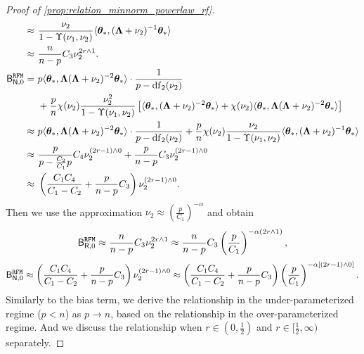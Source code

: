 \begin{proof}[Proof of \cref{prop:relation_minnorm_powerlaw_rf}]
\[\begin{aligned}
\approx&~ \frac{\nu_2}{1 - \Upsilon(\nu_1, \nu_2)} \langle {\boldsymbol \theta}_*, ({\boldsymbol \Lambda} + \nu_2)^{-1} {\boldsymbol \theta}_* \rangle\\
\approx&~ \frac{n}{n-p} C_3 \nu_2^{2r\wedge1}.\\
\mathsf B_{\mathsf N,0}^{\tt RFM} =&~ p \langle {\boldsymbol \theta}_*, {\boldsymbol \Lambda} ( {\boldsymbol \Lambda} + \nu_2)^{-2} {\boldsymbol \theta}_* \rangle \cdot \frac{1}{p - {\rm df}_2(\nu_2)}\\
&~+ \frac{p}{n} \chi(\nu_2) \frac{\nu_2^2}{1 - \Upsilon(\nu_1, \nu_2)} \left[ \langle {\boldsymbol \theta}_*, ({\boldsymbol \Lambda} + \nu_2)^{-2} {\boldsymbol \theta}_* \rangle + \chi(\nu_2) \langle {\boldsymbol \theta}_*, {\boldsymbol \Lambda} ({\boldsymbol \Lambda} + \nu_2)^{-2} {\boldsymbol \theta}_* \rangle \right] \\
\approx&~ p \langle {\boldsymbol \theta}_*, {\boldsymbol \Lambda} ( {\boldsymbol \Lambda} + \nu_2)^{-2} {\boldsymbol \theta}_* \rangle \cdot \frac{1}{p - {\rm df}_2(\nu_2)} + \frac{p}{n} \chi(\nu_2) \frac{\nu_2}{1 - \Upsilon(\nu_1, \nu_2)} \langle {\boldsymbol \theta}_*, ({\boldsymbol \Lambda} + \nu_2)^{-1} {\boldsymbol \theta}_* \rangle\\
\approx&~ \frac{p}{p-\frac{C_2}{C_1}p} C_4 \nu_2^{(2r-1)\wedge0} + \frac{p}{n-p} C_3 \nu_2^{(2r-1)\wedge0}\\
\approx&~ \left(\frac{C_1C_4}{C_1-C_2} + \frac{p}{n-p}C_3\right) \nu_2^{(2r-1)\wedge0}.
\end{aligned}
\]
Then we use the approximation $\nu_2 \approx (\frac{p}{C_1})^{-\alpha}$ and obtain
\[
\begin{aligned}
\mathsf B_{\mathsf R,0}^{\tt RFM} 
\approx \frac{n}{n-p} C_3 \nu_2^{2r\wedge1} \approx \frac{n}{n-p} C_3 \left( \frac{p}{C_1} \right)^{-\alpha\left(2r\wedge1\right)},
\end{aligned}
\]
\[
\begin{aligned}
\mathsf B_{\mathsf N,0}^{\tt RFM} \approx \left(\frac{C_1C_4}{C_1-C_2}+\frac{p}{n-p}C_3\right) \nu_2^{(2r-1)\wedge0} \approx \left(\frac{C_1C_4}{C_1-C_2}+\frac{p}{n-p}C_3\right) \left(\frac{p}{C_1}\right)^{-\alpha\left[(2r-1)\wedge0\right]}.
\end{aligned}
\]
Similarly to the bias term, we derive the relationship in the under-parameterized regime ($p < n$) as $p \to n$, based on the relationship in the over-parameterized regime. And we discuss the relationship when $r \in (0, \frac{1}{2})$ and $r \in [\frac{1}{2}, \infty)$ separately.


\end{proof}
